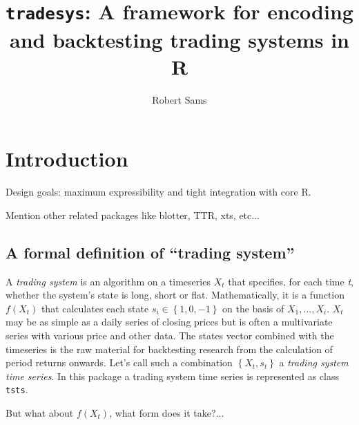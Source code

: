 \documentclass[a4]{article}
\newcommand{\code}[1]{\texttt{#1}}
\begin{document}
\author{Robert Sams}
\title{\code{tradesys}: A framework for encoding and backtesting trading systems in R}
\maketitle



\section{Introduction} \label{sec:intro}
Design goals: maximum expressibility and tight integration with core R.

Mention other related packages like blotter, TTR, xts, etc...

\subsection{A formal definition of ``trading system''}
A \emph{trading system} is an algorithm on a timeseries $X_{t}$ that
specifies, for each time \emph{t}, whether the system's state is long,
short or flat. Mathematically, it is a function $f(X_{t})$ that
calculates each state $s_{i} \in \left\{1,0,-1\right\}$ on the basis
of $X_{1}, ..., X_{i}$. $X_{t}$ may be as simple as a daily series of
closing prices but is often a multivariate series with various price
and other data. The states vector combined with the timeseries is the
raw material for backtesting research from the calculation of period
returns onwards. Let's call such a combination $\left\{X_{t},
s_{t}\right\}$ a \emph{trading system time series}. In this package a
trading system time series is represented as class \code{tsts}.

But what about $f(X_{t})$, what form does it take?...
\end{document}
